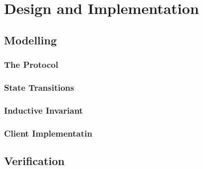 \chapter{Design and Implementation}

\section{Modelling}

\subsection{The Protocol}

\subsection{State Transitions}

\subsection{Inductive Invariant}

\subsection{Client Implementatin}

\section{Verification}
